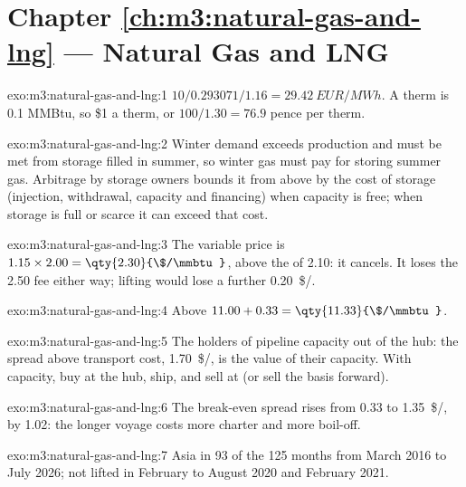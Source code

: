 \section*{Chapter \ref{ch:m3:natural-gas-and-lng} --- Natural Gas and LNG}

\begin{solution}{exo:m3:natural-gas-and-lng:1}
$10/0.293071/1.16 = \qty{29.42}{EUR/MWh}$. A therm is 0.1 MMBtu, so \$1 a therm, or
$100/1.30 = 76.9$ pence per therm.
\end{solution}

\begin{solution}{exo:m3:natural-gas-and-lng:2}
Winter demand exceeds production and must be met from storage filled in summer, so
winter gas must pay for storing summer gas. Arbitrage by storage owners bounds it from
above by the cost of storage (injection, withdrawal, capacity and financing) when
capacity is free; when storage is full or scarce it can exceed that cost.
\end{solution}

\begin{solution}{exo:m3:natural-gas-and-lng:3}
The variable price is $1.15 \times 2.00 = \qty{2.30}{\$/\mmbtu}$, above the  of
2.10: it cancels. It loses the \qty{2.50}{} fee either way; lifting would lose a further
\qty{0.20}{\$/\mmbtu}.
\end{solution}

\begin{solution}{exo:m3:natural-gas-and-lng:4}
Above $11.00 + 0.33 = \qty{11.33}{\$/\mmbtu}$.
\end{solution}

\begin{solution}{exo:m3:natural-gas-and-lng:5}
The holders of pipeline capacity out of the hub: the spread above transport cost,
\qty{1.70}{\$/\mmbtu}, is the value of their capacity. With capacity, buy at the hub, ship,
and sell at  (or sell the basis forward).
\end{solution}

\begin{solution}{exo:m3:natural-gas-and-lng:6}
The break-even spread rises from \qty{0.33}{} to \qty{1.35}{\$/\mmbtu}, by \qty{1.02}{}: the
longer voyage costs more charter and more boil-off.
\end{solution}

\begin{solution}{exo:m3:natural-gas-and-lng:7}
Asia in 93 of the 125 months from March 2016 to July 2026; not lifted in February to August
2020 and February 2021.
\end{solution}

